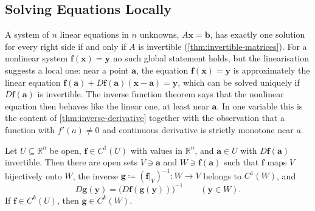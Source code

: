 \subsection{Solving Equations Locally}

A system of $n$ linear equations in $n$ unknowns, $A\mathbf x=\mathbf b$, has exactly one solution for every right side if and only if $A$ is invertible (\cref{thm:invertible-matrices}). For a nonlinear system $\mathbf f(\mathbf x)=\mathbf y$ no such global statement holds, but the linearisation suggests a local one: near a point $\mathbf a$, the equation $\mathbf f(\mathbf x)=\mathbf y$ is approximately the linear equation $\mathbf f(\mathbf a)+D\mathbf f(\mathbf a)(\mathbf x-\mathbf a)=\mathbf y$, which can be solved uniquely if $D\mathbf f(\mathbf a)$ is invertible. The inverse function theorem says that the nonlinear equation then behaves like the linear one, at least near $\mathbf a$. In one variable this is the content of \cref{thm:inverse-derivative} together with the observation that a function with $f'(a)\ne0$ and continuous derivative is strictly monotone near $a$.

\begin{theorem}
\label{thm:inverse-function}
Let $U\subseteq\mathbb R^n$ be open, $\mathbf f\in C^1(U)$ with values in $\mathbb R^n$, and $\mathbf a\in U$ with $D\mathbf f(\mathbf a)$ invertible. Then there are open sets $V\ni\mathbf a$ and $W\ni\mathbf f(\mathbf a)$ such that $\mathbf f$ maps $V$ bijectively onto $W$, the inverse $\mathbf g\coloneqq(\mathbf f|_V)^{-1}\colon W\to V$ belongs to $C^1(W)$, and
\[
D\mathbf g(\mathbf y)=\bigl(D\mathbf f(\mathbf g(\mathbf y))\bigr)^{-1}\qquad(\mathbf y\in W).
\]
If $\mathbf f\in C^k(U)$, then $\mathbf g\in C^k(W)$.
\end{theorem}

